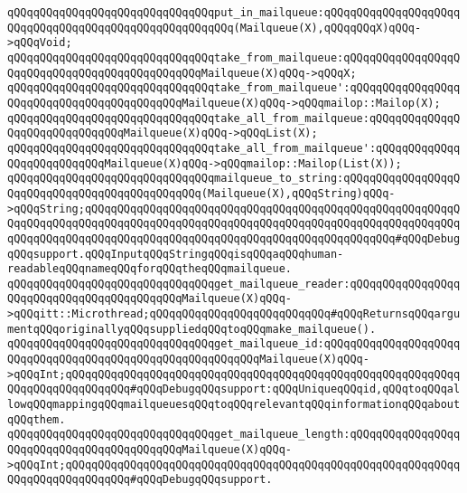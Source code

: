 \newline
\verb|qQQqqQQqqQQqqQQqqQQqqQQqqQQqqQQqput_in_mailqueue:qQQqqQQqqQQqqQQqqQQqqQQqqQQqqQQqqQQqqQQqqQQqqQQqqQQqqQQq(Mailqueue(X),qQQqqQQqX)qQQq->qQQqVoid;|\newline
\newline
\verb|qQQqqQQqqQQqqQQqqQQqqQQqqQQqqQQqtake_from_mailqueue:qQQqqQQqqQQqqQQqqQQqqQQqqQQqqQQqqQQqqQQqqQQqqQQqMailqueue(X)qQQq->qQQqX;|\newline
\verb|qQQqqQQqqQQqqQQqqQQqqQQqqQQqqQQqtake_from_mailqueue':qQQqqQQqqQQqqQQqqQQqqQQqqQQqqQQqqQQqqQQqqQQqMailqueue(X)qQQq->qQQqmailop::Mailop(X);|\newline
\newline
\verb|qQQqqQQqqQQqqQQqqQQqqQQqqQQqqQQqtake_all_from_mailqueue:qQQqqQQqqQQqqQQqqQQqqQQqqQQqqQQqMailqueue(X)qQQq->qQQqList(X);|\newline
\verb|qQQqqQQqqQQqqQQqqQQqqQQqqQQqqQQqtake_all_from_mailqueue':qQQqqQQqqQQqqQQqqQQqqQQqqQQqMailqueue(X)qQQq->qQQqmailop::Mailop(List(X));|\newline
\newline
\verb|qQQqqQQqqQQqqQQqqQQqqQQqqQQqqQQqmailqueue_to_string:qQQqqQQqqQQqqQQqqQQqqQQqqQQqqQQqqQQqqQQqqQQqqQQq(Mailqueue(X),qQQqString)qQQq->qQQqString;qQQqqQQqqQQqqQQqqQQqqQQqqQQqqQQqqQQqqQQqqQQqqQQqqQQqqQQqqQQqqQQqqQQqqQQqqQQqqQQqqQQqqQQqqQQqqQQqqQQqqQQqqQQqqQQqqQQqqQQqqQQqqQQqqQQqqQQqqQQqqQQqqQQqqQQqqQQqqQQqqQQqqQQqqQQqqQQqqQQqqQQqqQQq#qQQqDebugqQQqsupport.qQQqInputqQQqStringqQQqisqQQqaqQQqhuman-readableqQQqnameqQQqforqQQqtheqQQqmailqueue.|\newline
\newline
\verb|qQQqqQQqqQQqqQQqqQQqqQQqqQQqqQQqget_mailqueue_reader:qQQqqQQqqQQqqQQqqQQqqQQqqQQqqQQqqQQqqQQqqQQqMailqueue(X)qQQq->qQQqitt::Microthread;qQQqqQQqqQQqqQQqqQQqqQQqqQQq#qQQqReturnsqQQqargumentqQQqoriginallyqQQqsuppliedqQQqtoqQQqmake_mailqueue().|\newline
\verb|qQQqqQQqqQQqqQQqqQQqqQQqqQQqqQQqget_mailqueue_id:qQQqqQQqqQQqqQQqqQQqqQQqqQQqqQQqqQQqqQQqqQQqqQQqqQQqqQQqqQQqMailqueue(X)qQQq->qQQqInt;qQQqqQQqqQQqqQQqqQQqqQQqqQQqqQQqqQQqqQQqqQQqqQQqqQQqqQQqqQQqqQQqqQQqqQQqqQQqqQQq#qQQqDebugqQQqsupport:qQQqUniqueqQQqid,qQQqtoqQQqallowqQQqmappingqQQqmailqueuesqQQqtoqQQqrelevantqQQqinformationqQQqaboutqQQqthem.|\newline
\verb|qQQqqQQqqQQqqQQqqQQqqQQqqQQqqQQqget_mailqueue_length:qQQqqQQqqQQqqQQqqQQqqQQqqQQqqQQqqQQqqQQqqQQqMailqueue(X)qQQq->qQQqInt;qQQqqQQqqQQqqQQqqQQqqQQqqQQqqQQqqQQqqQQqqQQqqQQqqQQqqQQqqQQqqQQqqQQqqQQqqQQqqQQq#qQQqDebugqQQqsupport.|\newline
